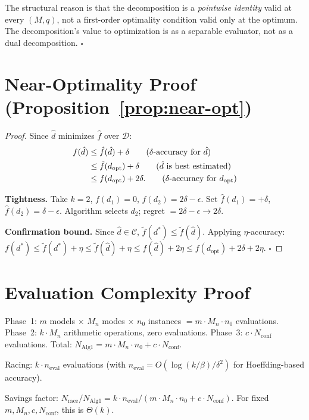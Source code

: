\documentclass[11pt]{article}
\newtheorem{proof}{Proof}
\newcommand{\cD}{\mathcal{D}}
\newcommand{\cC}{\mathcal{C}}
\newcommand{\Mn}{M_n}
\newcommand{\qed}{\hfill\(\square\)}
\begin{document}
The structural reason is that the decomposition is a \emph{pointwise
identity} valid at every $(M, q)$, not a first-order optimality condition
valid only at the optimum.  The decomposition's value to optimization is
as a separable evaluator, not as a dual decomposition. \qed

\section{Near-Optimality Proof (Proposition~\ref{prop:near-opt})}
\label{app:near-opt}

\begin{proof}
Since $\hat{d}$ minimizes $\hat{f}$ over $\cD$:
\begin{align}
  f(\hat{d})
  &\le \hat{f}(\hat{d}) + \delta
    \tag{$\delta$-accuracy for $\hat{d}$} \\
  &\le \hat{f}(d_{\mathrm{opt}}) + \delta
    \tag{$\hat{d}$ is best estimated} \\
  &\le f(d_{\mathrm{opt}}) + 2\delta.
    \tag{$\delta$-accuracy for $d_{\mathrm{opt}}$}
\end{align}

\textbf{Tightness.}
Take $k{=}2$, $f(d_1) = 0$, $f(d_2) = 2\delta - \epsilon$.
Set $\hat{f}(d_1) = +\delta$, $\hat{f}(d_2) = \delta - \epsilon$.
Algorithm selects $d_2$; regret $= 2\delta - \epsilon \to 2\delta$.

\textbf{Confirmation bound.}
Since $\hat{d} \in \cC$, $\tilde{f}(d^*) \le \tilde{f}(\hat{d})$.
Applying $\eta$-accuracy:
$f(d^*) \le \tilde{f}(d^*) + \eta \le \tilde{f}(\hat{d}) + \eta
\le f(\hat{d}) + 2\eta \le f(d_{\mathrm{opt}}) + 2\delta + 2\eta$. \qed
\end{proof}

\section{Evaluation Complexity Proof}
\label{app:eval-complexity}

Phase~1: $m$ models $\times$ $\Mn$ modes $\times$ $n_0$ instances
$= m \cdot \Mn \cdot n_0$ evaluations.
Phase~2: $k \cdot \Mn$ arithmetic operations, zero evaluations.
Phase~3: $c \cdot N_{\mathrm{conf}}$ evaluations.
Total: $N_{\mathrm{Alg1}} = m \cdot \Mn \cdot n_0 + c \cdot N_{\mathrm{conf}}$.

Racing: $k \cdot n_{\mathrm{eval}}$ evaluations (with
$n_{\mathrm{eval}} = O(\log(k/\beta)/\delta^2)$ for Hoeffding-based
accuracy).

Savings factor:
$N_{\mathrm{race}}/N_{\mathrm{Alg1}} = k \cdot n_{\mathrm{eval}} /
(m \cdot \Mn \cdot n_0 + c \cdot N_{\mathrm{conf}})$.
For fixed $m, \Mn, c, N_{\mathrm{conf}}$, this is $\Theta(k)$.
\end{document}
